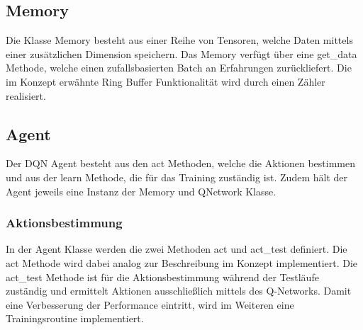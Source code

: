 \subsection{Memory} \label{subsec:Implementierung_Memory_DQN}
Die Klasse Memory besteht aus einer Reihe von Tensoren, welche Daten mittels einer zusätzlichen Dimension speichern.
Das Memory verfügt über eine get\_data Methode, welche einen zufallsbasierten Batch an Erfahrungen zurückliefert. Die im Konzept erwähnte Ring Buffer Funktionalität  wird durch einen Zähler realisiert.

\subsection{Agent} \label{subsec:Implementierung_DQN_Agent}
Der DQN Agent besteht aus den act Methoden, welche die Aktionen bestimmen und aus der learn Methode, die für das Training zuständig ist. Zudem hält der Agent jeweils eine Instanz der Memory und QNetwork Klasse.

\subsubsection{Aktionsbestimmung} \label{subsubsec:Implementierung_Aktionsbestimmung_DQN}
In der Agent Klasse werden die zwei Methoden act und act\_test definiert. Die act Methode wird dabei analog zur Beschreibung im Konzept  implementiert.
Die act\_test Methode ist für die Aktionsbestimmung während der Testläufe zuständig und ermittelt Aktionen ausschließlich mittels des Q-Networks.
Damit eine Verbesserung der Performance eintritt, wird im Weiteren eine Trainingsroutine implementiert.


